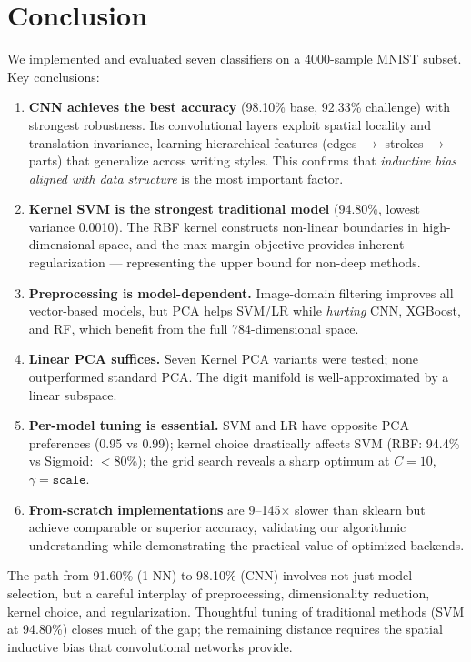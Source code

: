 \documentclass[11pt,a4paper]{article}
\begin{document}
\section{Conclusion}

We implemented and evaluated seven classifiers on a 4000-sample MNIST subset. Key conclusions:

\begin{enumerate}
    \item \textbf{CNN achieves the best accuracy} (98.10\% base, 92.33\% challenge) with strongest robustness. Its convolutional layers exploit spatial locality and translation invariance, learning hierarchical features (edges $\to$ strokes $\to$ parts) that generalize across writing styles. This confirms that \emph{inductive bias aligned with data structure} is the most important factor.

    \item \textbf{Kernel SVM is the strongest traditional model} (94.80\%, lowest variance 0.0010). The RBF kernel constructs non-linear boundaries in high-dimensional space, and the max-margin objective provides inherent regularization — representing the upper bound for non-deep methods.

    \item \textbf{Preprocessing is model-dependent.} Image-domain filtering improves all vector-based models, but PCA helps SVM/LR while \emph{hurting} CNN, XGBoost, and RF, which benefit from the full 784-dimensional space.

    \item \textbf{Linear PCA suffices.} Seven Kernel PCA variants were tested; none outperformed standard PCA. The digit manifold is well-approximated by a linear subspace.

    \item \textbf{Per-model tuning is essential.} SVM and LR have opposite PCA preferences (0.95 vs 0.99); kernel choice drastically affects SVM (RBF: 94.4\% vs Sigmoid: $<$80\%); the grid search reveals a sharp optimum at $C\!=\!10$, $\gamma\!=\!\texttt{scale}$.

    \item \textbf{From-scratch implementations} are 9--145$\times$ slower than sklearn but achieve comparable or superior accuracy, validating our algorithmic understanding while demonstrating the practical value of optimized backends.
\end{enumerate}

The path from 91.60\% (1-NN) to 98.10\% (CNN) involves not just model selection, but a careful interplay of preprocessing, dimensionality reduction, kernel choice, and regularization. Thoughtful tuning of traditional methods (SVM at 94.80\%) closes much of the gap; the remaining distance requires the spatial inductive bias that convolutional networks provide.
\end{document}
